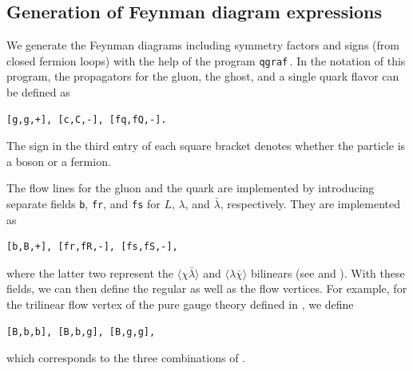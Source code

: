 \label{sec:implementation}
\subsection{Generation of Feynman diagram expressions}

We generate the Feynman diagrams including symmetry factors and signs
(from closed fermion loops) with the help of the program
\texttt{qgraf}\,\cite{Nogueira:1991ex,Nogueira:2006pq}. In the notation
of this program, the propagators for the gluon, the ghost, and a single
quark flavor can be defined as
\begin{verbatim}
[g,g,+], [c,C,-], [fq,fQ,-].
\end{verbatim}
The sign in the third entry of each square bracket
denotes whether the particle is a boson or a fermion.

The flow lines for the gluon and the quark are implemented by
introducing separate fields \texttt{b}, \texttt{fr}, and \texttt{fs} for
$L$, $\lambda$, and $\bar\lambda$, respectively. They are implemented as
\begin{verbatim}
[b,B,+], [fr,fR,-], [fs,fS,-],
\end{verbatim}
where the latter two represent the $\langle\chi\bar\lambda\rangle$ and
$\langle\lambda\bar\chi\rangle$ bilinears (see  and
). With these fields, we can then define the
regular as well as the flow vertices. For example, for the trilinear
flow vertex of the pure gauge theory defined in , we
define
\begin{verbatim}
[B,b,b], [B,b,g], [B,g,g],
\end{verbatim}
which corresponds to the three combinations of
.


